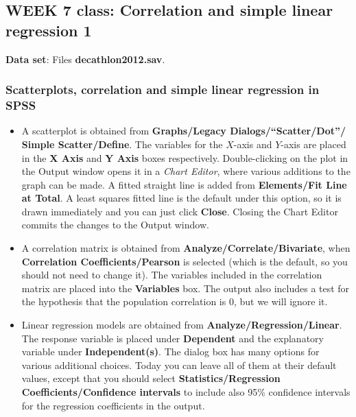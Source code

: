 \documentclass[11pt,a4paper,openany]{book}
\begin{document}
\newpage

\subsection{WEEK 7 class: Correlation and simple linear regression
1}\label{week-7-class-correlation-and-simple-linear-regression-1}

\textbf{Data set}: Files \textbf{decathlon2012.sav}.

\subsubsection*{Scatterplots, correlation and simple linear regression
in
SPSS}\label{scatterplots-correlation-and-simple-linear-regression-in-spss}

\begin{itemize}
\item
  A scatterplot is obtained from \textbf{Graphs/Legacy
  Dialogs/``Scatter/Dot''/ Simple Scatter/Define}. The variables for the
  \(X\)-axis and \(Y\)-axis are placed in the \textbf{X Axis} and
  \textbf{Y Axis} boxes respectively. Double-clicking on the plot in the
  Output window opens it in a \emph{Chart Editor}, where various
  additions to the graph can be made. A fitted straight line is added
  from \textbf{Elements/Fit Line at Total}. A least squares fitted line
  is the default under this option, so it is drawn immediately and you
  can just click \textbf{Close}. Closing the Chart Editor commits the
  changes to the Output window.
\item
  A correlation matrix is obtained from
  \textbf{Analyze/Correlate/Bivariate}, when \textbf{Correlation
  Coefficients/Pearson} is selected (which is the default, so you should
  not need to change it). The variables included in the correlation
  matrix are placed into the \textbf{Variables} box. The output also
  includes a test for the hypothesis that the population correlation is
  0, but we will ignore it.
\item
  Linear regression models are obtained from
  \textbf{Analyze/Regression/Linear}. The response variable is placed
  under \textbf{Dependent} and the explanatory variable under
  \textbf{Independent(s)}. The dialog box has many options for various
  additional choices. Today you can leave all of them at their default
  values, except that you should select \textbf{Statistics/Regression
  Coefficients/Confidence intervals} to include also 95\% confidence
  intervals for the regression coefficients in the output.
\end{itemize}
\end{document}
